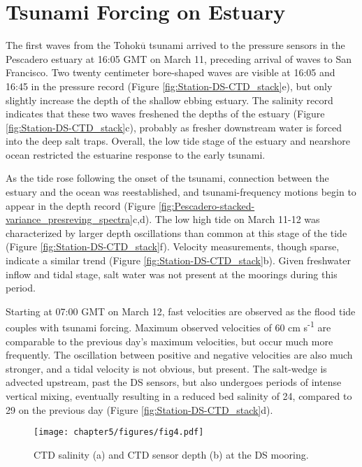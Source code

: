 \section{Tsunami Forcing on Estuary}

The first waves from the Tohok$\overline{\mathrm{u}}$ tsunami arrived to the pressure sensors
in the Pescadero estuary at 16:05 GMT on March 11, preceding arrival
of waves to San Francisco. Two twenty centimeter bore-shaped waves
are visible at 16:05 and 16:45 in the pressure record (Figure \ref{fig:Station-DS-CTD_stack}e),
but only slightly increase the depth of the shallow ebbing estuary.
The salinity record indicates that these two waves freshened the depths
of the estuary (Figure \ref{fig:Station-DS-CTD_stack}c), probably
as fresher downstream water is forced into the deep salt traps. Overall,
the low tide stage of the estuary and nearshore ocean restricted the
estuarine response to the early tsunami. 

As the tide rose following the onset of the tsunami, connection between
the estuary and the ocean was reestablished, and tsunami-frequency
motions begin to appear in the depth record (Figure \ref{fig:Pescadero-stacked-variance_presreving_spectra}c,d).
The low high tide on March 11-12 was characterized by larger depth
oscillations than common at this stage of the tide (Figure \ref{fig:Station-DS-CTD_stack}f).
Velocity measurements, though sparse, indicate a similar trend (Figure
\ref{fig:Station-DS-CTD_stack}b). Given freshwater inflow and tidal
stage, salt water was not present at the moorings during this period. 

Starting at 07:00 GMT on March 12, fast velocities are observed as
the flood tide couples with tsunami forcing. Maximum observed velocities
of 60 cm s\textsuperscript{-1} are comparable to the previous day's
maximum velocities, but occur much more frequently. The oscillation
between positive and negative velocities are also much stronger, and
a tidal velocity is not obvious, but present. The salt-wedge is advected
upstream, past the DS sensors, but also undergoes periods of intense
vertical mixing, eventually resulting in a reduced bed salinity of
24, compared to 29 on the previous day (Figure \ref{fig:Station-DS-CTD_stack}d). 



\begin{figure}
\texttt{[image: chapter5/figures/fig4.pdf]}

\protect\caption{CTD salinity (a) and CTD sensor depth (b) at the DS mooring. \label{fig:ctd_longer_record}}
\end{figure}

